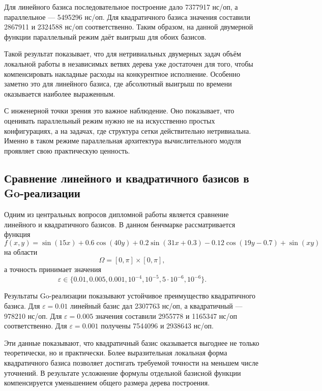 Для линейного базиса последовательное построение дало 7377917 нс/оп, а параллельное --- 5495296 нс/оп. Для квадратичного базиса значения составили 2867911 и 2324588 нс/оп соответственно. Таким образом, на данной двумерной функции параллельный режим даёт выигрыш для обоих базисов.

Такой результат показывает, что для нетривиальных двумерных задач объём локальной работы в независимых ветвях дерева уже достаточен для того, чтобы компенсировать накладные расходы на конкурентное исполнение. Особенно заметно это для линейного базиса, где абсолютный выигрыш по времени оказывается наиболее выраженным.

С инженерной точки зрения это важное наблюдение. Оно показывает, что оценивать параллельный режим нужно не на искусственно простых конфигурациях, а на задачах, где структура сетки действительно нетривиальна. Именно в таком режиме параллельная архитектура вычислительного модуля проявляет свою практическую ценность.

\subsection{Сравнение линейного и квадратичного базисов в Go-реализации}

Одним из центральных вопросов дипломной работы является сравнение линейного и квадратичного базисов. В данном бенчмарке рассматривается функция
\begin{equation}
    f(x, y) = \sin(15x) + 0.6\cos(40y) + 0.2\sin(31x + 0.3) - 0.12\cos(19y - 0.7) + \sin(xy)
\end{equation}
на области
\begin{equation}
    \Omega = [0, \pi] \times [0, \pi],
\end{equation}
а точность принимает значения
\begin{equation}
    \varepsilon \in \{0.01, 0.005, 0.001, 10^{-4}, 10^{-5}, 5\cdot10^{-6}, 10^{-6}\}.
\end{equation}

Результаты Go-реализации показывают устойчивое преимущество квадратичного базиса. Для $\varepsilon = 0.01$ линейный базис дал 2307763 нс/оп, а квадратичный --- 978210 нс/оп. Для $\varepsilon = 0.005$ значения составили 2955778 и 1165347 нс/оп соответственно. Для $\varepsilon = 0.001$ получены 7544096 и 2938643 нс/оп.

Эти данные показывают, что квадратичный базис оказывается выгоднее не только теоретически, но и практически. Более выразительная локальная форма квадратичного базиса позволяет достигать требуемой точности на меньшем числе уточнений. В результате усложнение формулы отдельной базисной функции компенсируется уменьшением общего размера дерева построения.

